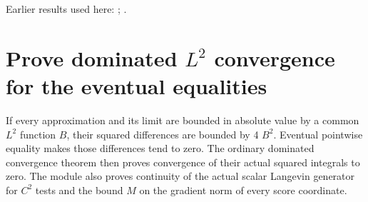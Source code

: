 \documentclass[11pt,a4paper]{article}
\begin{document}
Earlier results used here: \cite[Section~3.46.14]{LangevinLean2026ULASC}; \cite[Section~3.46.2]{LangevinLean2026ULASC}.

\section{\texorpdfstring{Prove dominated \(L^{2}\) convergence for the eventual equalities}{Prove dominated L² convergence for the eventual equalities}}


If every approximation and its limit are bounded in absolute value by a common \(L^{2}\) function \(B\), their squared differences are bounded by 4 \(B^2\). Eventual pointwise equality makes those differences tend to zero. The ordinary dominated convergence theorem then proves convergence of their actual squared integrals to zero. The module also proves continuity of the actual scalar Langevin generator for \(C^{2}\) tests and the bound \(M\) on the gradient norm of every score coordinate.
\end{document}
